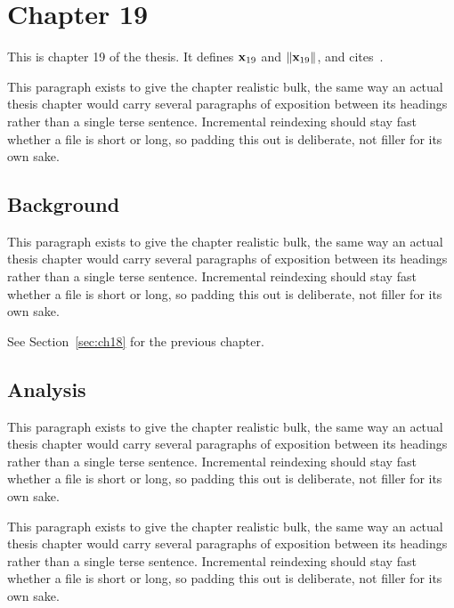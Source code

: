 \section{Chapter 19}
\label{sec:ch19}

This is chapter 19 of the thesis. It defines $\mathbf{x}_{19}$ and $\lVert \mathbf{x}_{19} \rVert$, and cites~\cite{ref1}.

This paragraph exists to give the chapter realistic bulk, the same way an actual thesis chapter would carry several paragraphs of exposition between its headings rather than a single terse sentence. Incremental reindexing should stay fast whether a file is short or long, so padding this out is deliberate, not filler for its own sake.

\subsection{Background}
\label{sec:ch19:background}

This paragraph exists to give the chapter realistic bulk, the same way an actual thesis chapter would carry several paragraphs of exposition between its headings rather than a single terse sentence. Incremental reindexing should stay fast whether a file is short or long, so padding this out is deliberate, not filler for its own sake.

See Section~\ref{sec:ch18} for the previous chapter.

\subsection{Analysis}
\label{sec:ch19:analysis}

This paragraph exists to give the chapter realistic bulk, the same way an actual thesis chapter would carry several paragraphs of exposition between its headings rather than a single terse sentence. Incremental reindexing should stay fast whether a file is short or long, so padding this out is deliberate, not filler for its own sake.

This paragraph exists to give the chapter realistic bulk, the same way an actual thesis chapter would carry several paragraphs of exposition between its headings rather than a single terse sentence. Incremental reindexing should stay fast whether a file is short or long, so padding this out is deliberate, not filler for its own sake.
